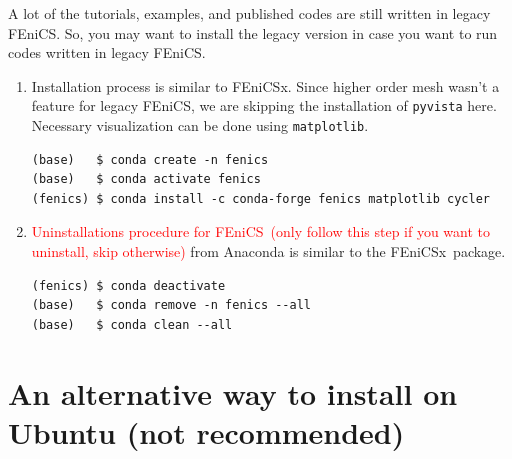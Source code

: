 \documentclass[12pt]{article}
\newcommand{\fenics}{\textsf{FEniCS}}
\newcommand{\fenicsx}{\textsf{FEniCSx}}
\begin{document}
A lot of the tutorials, examples, and published codes are still written in legacy \fenics. So, you may want to install the legacy version in case you want to run codes written in legacy \fenics.

\begin{enumerate}[label={\arabic*.}, leftmargin= 0.6 cm,itemsep = 0.2cm,topsep=.2cm, parsep=0.2cm]

\item Installation process is similar to \fenicsx. Since higher order mesh wasn't a feature for legacy \fenics,  we are skipping the installation of \texttt{pyvista} here. Necessary visualization can be done using \texttt{matplotlib}.

\begin{lstlisting}[style=terminal]
(base)   $ conda create -n fenics
(base)   $ conda activate fenics
(fenics) $ conda install -c conda-forge fenics matplotlib cycler
\end{lstlisting}

\item \textcolor{red}{Uninstallations procedure for \fenics \ (only follow this step if you want to uninstall, skip otherwise)} from Anaconda is similar to the \fenicsx \ package.

\begin{lstlisting}[style=terminal]
(fenics) $ conda deactivate
(base)   $ conda remove -n fenics --all
(base)   $ conda clean --all
\end{lstlisting}

\end{enumerate}

\section*{An alternative way to install on Ubuntu (not recommended)}
\end{document}
